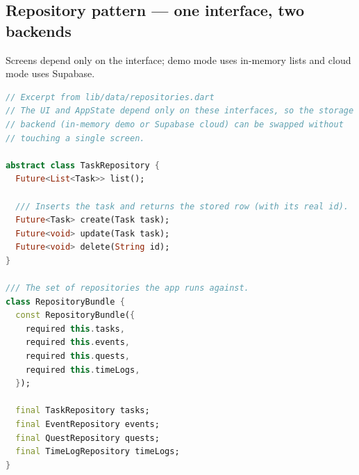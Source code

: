 \documentclass[12pt,a4paper]{article}
\begin{document}
\subsection{Repository pattern --- one interface, two backends}
Screens depend only on the interface; demo mode uses in-memory lists and
cloud mode uses Supabase.
\begin{lstlisting}[language=Dart, caption={Repository interface
(lib/data/repositories.dart)}]
// Excerpt from lib/data/repositories.dart
// The UI and AppState depend only on these interfaces, so the storage
// backend (in-memory demo or Supabase cloud) can be swapped without
// touching a single screen.

abstract class TaskRepository {
  Future<List<Task>> list();

  /// Inserts the task and returns the stored row (with its real id).
  Future<Task> create(Task task);
  Future<void> update(Task task);
  Future<void> delete(String id);
}

/// The set of repositories the app runs against.
class RepositoryBundle {
  const RepositoryBundle({
    required this.tasks,
    required this.events,
    required this.quests,
    required this.timeLogs,
  });

  final TaskRepository tasks;
  final EventRepository events;
  final QuestRepository quests;
  final TimeLogRepository timeLogs;
}
\end{lstlisting}
\end{document}
